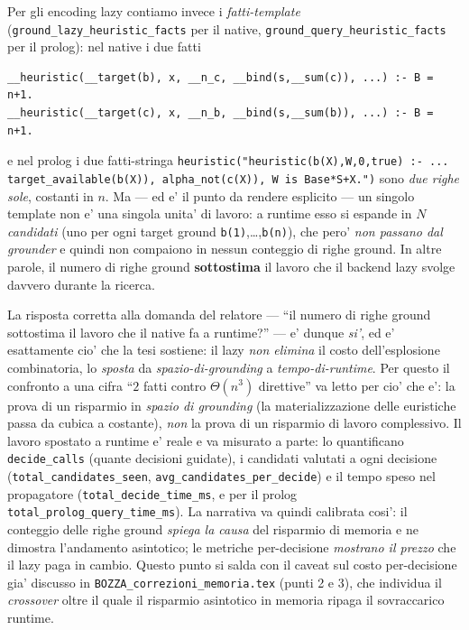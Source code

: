 Per gli encoding lazy contiamo invece i \emph{fatti-template}
(\texttt{ground\_lazy\_heuristic\_facts} per il native,
\texttt{ground\_query\_heuristic\_facts} per il prolog): nel native i due fatti
\begin{verbatim}
__heuristic(__target(b), x, __n_c, __bind(s,__sum(c)), ...) :- B = n+1.
__heuristic(__target(c), x, __n_b, __bind(s,__sum(b)), ...) :- B = n+1.
\end{verbatim}
e nel prolog i due fatti-stringa
\texttt{heuristic("heuristic(b(X),W,0,true) :- ... target\_available(b(X)),
alpha\_not(c(X)), W is Base*S+X.")} sono \emph{due righe sole}, costanti in $n$.
Ma --- ed e' il punto da rendere esplicito --- un singolo template non e' una
singola unita' di lavoro: a runtime esso si espande in \emph{$N$ candidati} (uno
per ogni target ground \texttt{b(1)},\dots,\texttt{b(n)}), che pero' \emph{non
passano dal grounder} e quindi non compaiono in nessun conteggio di righe ground.
In altre parole, il numero di righe ground \textbf{sottostima} il lavoro che il
backend lazy svolge davvero durante la ricerca.

La risposta corretta alla domanda del relatore --- ``il numero di righe ground
sottostima il lavoro che il native fa a runtime?'' --- e' dunque \emph{si'}, ed e'
esattamente cio' che la tesi sostiene: il lazy \emph{non elimina} il costo
dell'esplosione combinatoria, lo \emph{sposta} da \emph{spazio-di-grounding} a
\emph{tempo-di-runtime}. Per questo il confronto a una cifra
``$2$ fatti contro $\Theta(n^3)$ direttive'' va letto per cio' che e': la prova di
un risparmio in \emph{spazio di grounding} (la materializzazione delle euristiche
passa da cubica a costante), \emph{non} la prova di un risparmio di lavoro
complessivo. Il lavoro spostato a runtime e' reale e va misurato a parte: lo
quantificano \texttt{decide\_calls} (quante decisioni guidate), i candidati
valutati a ogni decisione (\texttt{total\_candidates\_seen},
\texttt{avg\_candidates\_per\_decide}) e il tempo speso nel propagatore
(\texttt{total\_decide\_time\_ms}, e per il prolog
\texttt{total\_prolog\_query\_time\_ms}). La narrativa va quindi calibrata cosi':
il conteggio delle righe ground \emph{spiega la causa} del risparmio di memoria e
ne dimostra l'andamento asintotico; le metriche per-decisione \emph{mostrano il
prezzo} che il lazy paga in cambio. Questo punto si salda con il caveat sul
costo per-decisione gia' discusso in \texttt{BOZZA\_correzioni\_memoria.tex}
(punti 2 e 3), che individua il \emph{crossover} oltre il quale il risparmio
asintotico in memoria ripaga il sovraccarico runtime.

